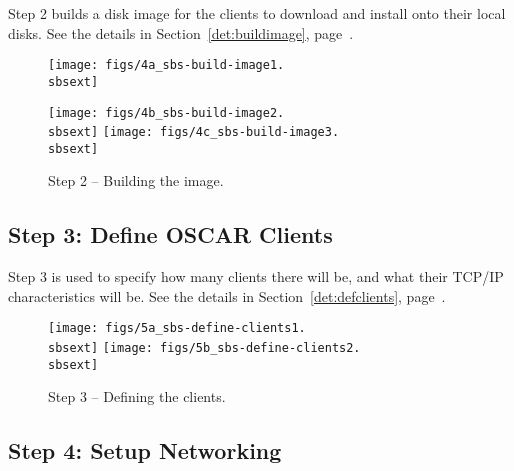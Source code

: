 Step 2 builds a disk image for the clients to download and install
onto their local disks.  See the details in
Section~\ref{det:buildimage}, page~\pageref{det:buildimage}.

\begin{figure}[h!]
  \begin{center}
    \centerline{\texttt{[image: figs/4a\_sbs-build-image1.\\sbsext]}}
    \vspace{\imgvskip}
    \centerline{
      \texttt{[image: figs/4b\_sbs-build-image2.\\sbsext]}
      \hspace{\imghskip}
      \texttt{[image: figs/4c\_sbs-build-image3.\\sbsext]}
      }
    \caption{Step 2 -- Building the image.}
    \label{fig:sbs-build-image}
  \end{center}
\end{figure}



\clearpage
\subsection{Step 3: Define OSCAR Clients}

Step 3 is used to specify how many clients there will be, and what
their TCP/IP characteristics will be.  See the details in
Section~\ref{det:defclients}, page~\pageref{det:defclients}.
 
\begin{figure}[ht!]
  \begin{center}
    \centerline{
      \texttt{[image: figs/5a\_sbs-define-clients1.\\sbsext]}
      \hspace{\imghskip}
      \texttt{[image: figs/5b\_sbs-define-clients2.\\sbsext]}
      }
    \caption{Step 3 -- Defining the clients.}
    \label{fig:sbs-define-clients}
  \end{center}
\end{figure}



\subsection{Step 4: Setup Networking}


